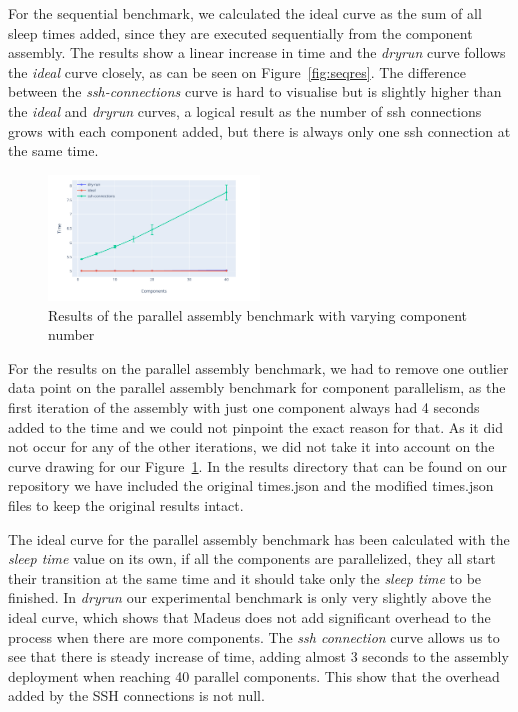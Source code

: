 For the sequential benchmark, we calculated the ideal curve as the sum
of all sleep times added, since they are executed sequentially from
the component assembly. The results show a linear increase in time and
the \emph{dryrun} curve follows the \emph{ideal} curve closely, as can
be seen on Figure~\ref{fig:seqres}. The difference between the
\emph{ssh-connections} curve is hard to visualise but is slightly
higher than the \emph{ideal} and \emph{dryrun} curves, a logical
result as the number of ssh connections grows with each component
added, but there is always only one ssh connection at the same time.

\begin{figure}[h]
  \begin{center} 
    \includegraphics[width=0.5\textwidth]{./images/evaluations_par_component.pdf}
    \caption{Results of the parallel assembly benchmark with varying component number}
    \label{fig:parcompres}
  \end{center}
\end{figure}

For the results on the parallel assembly benchmark, we had to remove
one outlier data point on the parallel assembly benchmark for
component parallelism, as the first iteration of the assembly with
just one component always had 4 seconds added to the time and we could
not pinpoint the exact reason for that. As it did not occur for any of
the other iterations, we did not take it into account on the curve
drawing for our Figure~\ref{fig:parcompres}. In the results directory
that can be found on our repository we have included the original
times.json and the modified times.json files to keep the original
results intact.

The ideal curve for the parallel assembly benchmark has been
calculated with the \emph{sleep time} value on its own, if all the
components are parallelized, they all start their transition at the
same time and it should take only the \emph{sleep time} to be
finished. In \emph{dryrun} our experimental benchmark is only very
slightly above the ideal curve, which shows that Madeus does not add
significant overhead to the process when there are more
components. The \emph{ssh connection} curve allows us to see that
there is steady increase of time, adding almost 3 seconds to the
assembly deployment when reaching 40 parallel components. This show
that the overhead added by the SSH connections is not null.

